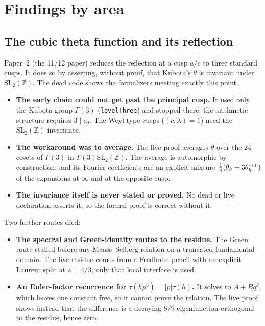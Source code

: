 \documentclass[11pt,a4paper]{article}
\newcommand{\lean}[1]{\nolinkurl{#1}}
\begin{document}
\section{Findings by area}

\subsection{The cubic theta function and its reflection}
Paper~2 (the 11/12 paper) reduces the reflection at a cusp $a/c$ to three standard cusps. It does
so by asserting, without proof, that Kubota's $\theta$ is invariant under $\mathrm{SL}_2(\mathbb
Z)$. The dead code shows the formalizers meeting exactly this point.
\begin{itemize}
\item \textbf{The early chain could not get past the principal cusp.} It used only the Kubota group
$\Gamma(3)$ (\lean{levelThree}) and stopped there: the arithmetic structure requires $3\mid c_0$.
The Weyl-type cusps ($(c,\lambda)=1$) need the $\mathrm{SL}_2(\mathbb Z)$-invariance.
\item \textbf{The workaround was to average.} The live proof averages $\theta$ over the 24 cosets of
$\Gamma(3)$ in $\Gamma(3)\mathrm{SL}_2(\mathbb Z)$. The average is automorphic by construction, and
its Fourier coefficients are an explicit mixture $\tfrac14(\theta_h+3\theta^{\rm opp}_h)$ of the
expansions at $\infty$ and at the opposite cusp.
\item \textbf{The invariance itself is never stated or proved.} No dead or live declaration asserts
it, so the formal proof is correct without it.
\end{itemize}

Two further routes died:
\begin{itemize}
\item \textbf{The spectral and Green-identity routes to the residue.} The Green route stalled before
any Maass--Selberg relation on a truncated fundamental domain. The live residue comes from a
Fredholm pencil with an explicit Laurent split at $s=4/3$; only that local interface is used.
\item \textbf{An Euler-factor recurrence for $\tau(hp^3)=|p|\tau(h)$.} It solves to $A+Bq^k$, which
leaves one constant free, so it cannot prove the relation. The live proof shows instead that the
difference is a decaying $8/9$-eigenfunction orthogonal to the residue, hence zero.
\end{itemize}
\end{document}
